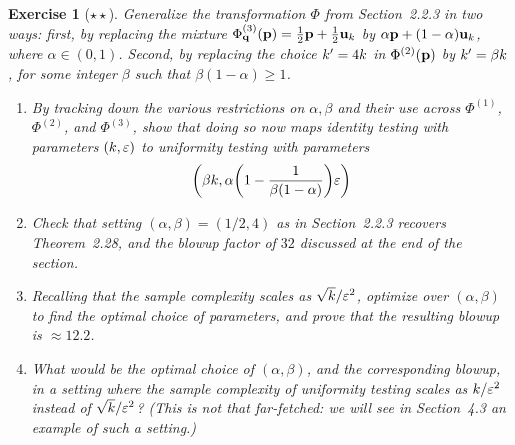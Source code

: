 \documentclass[biber]{nowfnt} %
\newtheorem{question}{Exercise}[chapter]
\begin{document}
\begin{question}[$\star\star$]\label{ex:l1:reduction:parameters}
Generalize the transformation $\Phi$ from Section~2.2.3 in two ways: first, by replacing the mixture $\Phi^{(3)}_{\mathbf{q}}(\mathbf{p}) = \frac{1}{2}\mathbf{p}+\frac{1}{2}\mathbf{u}_{ k } $ by $\alpha\mathbf{p}+(1-\alpha)\mathbf{u}_{ k } $, where $\alpha\in(0,1)$. Second, by replacing the choice $k'=4k$ in $\Phi^{(2)}(\mathbf{p})$ by $k'=\beta k$, for some integer $\beta$ such that $\beta(1-\alpha)\geq 1$.
\begin{enumerate}
  \item By tracking down the various restrictions on $\alpha,\beta$ and their use across $\Phi^{(1)}$, $\Phi^{(2)}$, and $\Phi^{(3)}$, show that doing so now maps identity testing with parameters $(k,\varepsilon)$ to uniformity testing with parameters 
  \[
  	\Paren{\beta\ab,\alpha\Paren{1-\frac{1}{\beta(1-\alpha)}}\dst}
  \]
  \item Check that setting $(\alpha,\beta)=(1/2,4)$ as in Section~2.2.3 recovers Theorem~2.28, and the blowup factor of $32$ discussed at the end of the section.
  \item Recalling that the sample complexity scales as $\sqrt{k}/\varepsilon^2$, optimize over $(\alpha,\beta)$ to find the optimal choice of parameters, and prove that the resulting blowup is $\approx 12.2$. %
  \item What would be the optimal choice of $(\alpha,\beta)$, and the corresponding blowup, in a setting where the sample complexity of uniformity testing scales as $k/\varepsilon^2$ instead of $\sqrt{k}/\varepsilon^2$? (This is not that far-fetched: we will see in Section~4.3 an example of such a setting.)  %
\end{enumerate}
\end{question}
\end{document}
